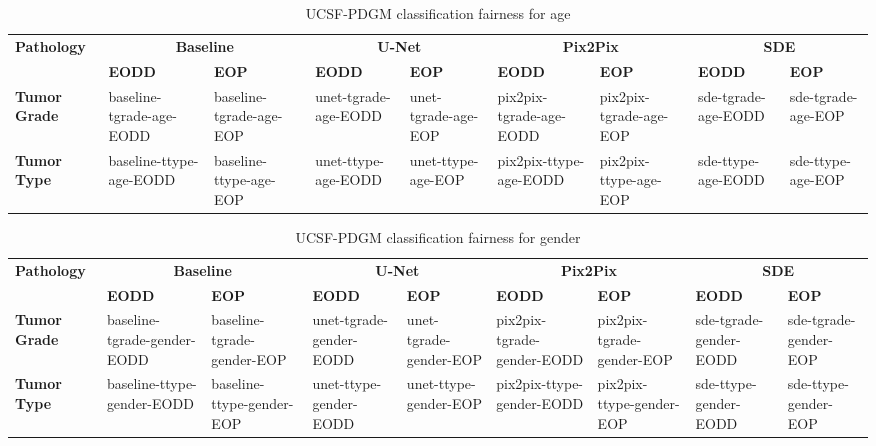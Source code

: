 \begin{table}[]
    \centering
    \caption{UCSF-PDGM classification fairness for age}\label{tab:ucsf_age}
    \begin{tabular}{l|llllllll}
    \hline
    \multirow{2}{*}{\textbf{Pathology}} & \multicolumn{2}{c|}{\textbf{Baseline}}                   & \multicolumn{2}{c|}{\textbf{U-Net}}                              & \multicolumn{2}{c|}{\textbf{Pix2Pix}}                              & \multicolumn{2}{c}{\textbf{SDE}}    \\ \cline{2-9}
                                                                                       & \textbf{EODD} & \textbf{EOP}  & \textbf{EODD} & \textbf{EOP}  & \textbf{EODD} & \textbf{EOP} & \textbf{EODD} & \textbf{EOP} \\ \hline
                                                                \textbf{Tumor Grade}  & baseline-tgrade-age-EODD & baseline-tgrade-age-EOP & unet-tgrade-age-EODD & unet-tgrade-age-EOP & pix2pix-tgrade-age-EODD & pix2pix-tgrade-age-EOP & sde-tgrade-age-EODD & sde-tgrade-age-EOP \\        
                                                              \textbf{Tumor Type} & baseline-ttype-age-EODD & baseline-ttype-age-EOP & unet-ttype-age-EODD & unet-ttype-age-EOP & pix2pix-ttype-age-EODD & pix2pix-ttype-age-EOP & sde-ttype-age-EODD & sde-ttype-age-EOP \\ \hline
    \end{tabular}
    \end{table}
    
    \begin{table}[]
        \centering
        \caption{UCSF-PDGM classification fairness for gender}\label{tab:ucsf_gender}
        \begin{tabular}{l|llllllll}
        \hline
        \multirow{2}{*}{\textbf{Pathology}} & \multicolumn{2}{c|}{\textbf{Baseline}}                   & \multicolumn{2}{c|}{\textbf{U-Net}}                              & \multicolumn{2}{c|}{\textbf{Pix2Pix}}                              & \multicolumn{2}{c}{\textbf{SDE}}    \\ \cline{2-9}
                                                                                           & \textbf{EODD} & \textbf{EOP}  & \textbf{EODD} & \textbf{EOP}  & \textbf{EODD} & \textbf{EOP} & \textbf{EODD} & \textbf{EOP} \\ \hline
                                                                    \textbf{Tumor Grade}  & baseline-tgrade-gender-EODD & baseline-tgrade-gender-EOP & unet-tgrade-gender-EODD & unet-tgrade-gender-EOP & pix2pix-tgrade-gender-EODD & pix2pix-tgrade-gender-EOP & sde-tgrade-gender-EODD & sde-tgrade-gender-EOP \\        
                                                                  \textbf{Tumor Type} & baseline-ttype-gender-EODD & baseline-ttype-gender-EOP & unet-ttype-gender-EODD & unet-ttype-gender-EOP & pix2pix-ttype-gender-EODD & pix2pix-ttype-gender-EOP & sde-ttype-gender-EODD & sde-ttype-gender-EOP \\ \hline
        \end{tabular}
        \end{table}
    
